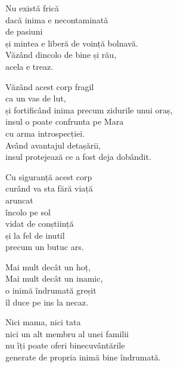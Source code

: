 Nu există frică\\
dacă inima e necontaminată\\
de pasiuni\\
și mintea e liberă de voință bolnavă.\\
Văzând dincolo de bine și rău,\\
acela e treaz.


Văzând acest corp fragil\\
ca un vas de lut,\\
și fortificând inima precum zidurile unui oraș,\\
insul o poate confrunta pe Mara\\
cu arma introspecției.\\
Având avantajul detașării,\\
insul protejează ce a fost deja dobândit.


Cu siguranță acest corp\\
curând va sta fără viață\\
aruncat\\
încolo pe sol\\
vidat de conștiință\\
și la fel de inutil\\
precum un butuc ars.


Mai mult decât un hoț,\\
Mai mult decât un inamic,\\
o inimă îndrumată greșit\\
îl duce pe ins la necaz.


Nici mama, nici tata\\
nici un alt membru al unei familii\\
nu îți poate oferi binecuvântările\\
generate de propria inimă bine îndrumată.
